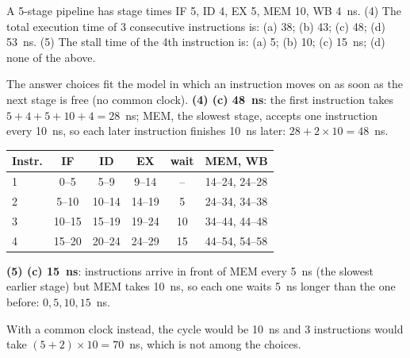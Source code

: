 \begin{exercise}
A 5-stage pipeline has stage times IF 5, ID 4, EX 5, MEM 10, WB 4~ns.
(4) The total execution time of 3 consecutive instructions is: (a) 38; (b) 43;
(c) 48; (d) 53~ns.
(5) The stall time of the 4th instruction is: (a) 5; (b) 10; (c) 15~ns; (d) none of
the above.
\end{exercise}
\begin{solution}
The answer choices fit the model in which an instruction moves on as soon as the
next stage is free (no common clock).
\textbf{(4) (c) 48~ns}: the first instruction takes $5+4+5+10+4=28$~ns; MEM, the
slowest stage, accepts one instruction every 10~ns, so each later instruction
finishes 10~ns later: $28+2\times10=48$~ns.
\begin{center}
\small
\begin{tabular}{@{}lccccc@{}}
\toprule
Instr. & IF & ID & EX & wait & MEM, WB \\
\midrule
1 & 0--5 & 5--9 & 9--14 & -- & 14--24, 24--28 \\
2 & 5--10 & 10--14 & 14--19 & 5 & 24--34, 34--38 \\
3 & 10--15 & 15--19 & 19--24 & 10 & 34--44, 44--48 \\
4 & 15--20 & 20--24 & 24--29 & 15 & 44--54, 54--58 \\
\bottomrule
\end{tabular}
\end{center}
\textbf{(5) (c) 15~ns}: instructions arrive in front of MEM every 5~ns (the slowest
earlier stage) but MEM takes 10~ns, so each one waits 5~ns longer than the one
before: $0, 5, 10, 15$~ns.

With a common clock instead, the cycle would be 10~ns and 3 instructions would take
$(5+2)\times10=70$~ns, which is not among the choices.
\end{solution}

